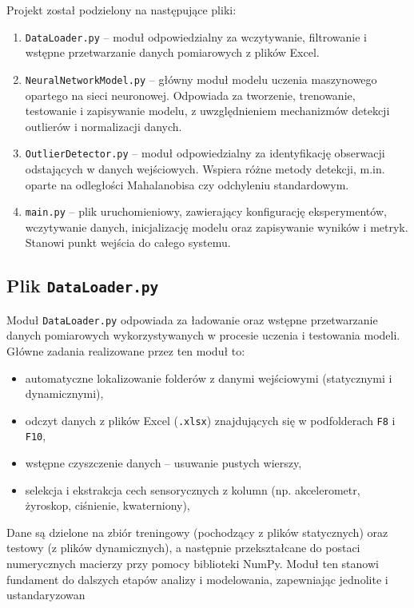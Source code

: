 \documentclass{classrep}
\begin{document}
Projekt został podzielony na następujące pliki:

\begin{enumerate}
	\item \texttt{DataLoader.py} – moduł odpowiedzialny za wczytywanie, filtrowanie i wstępne przetwarzanie danych pomiarowych z plików Excel.

	\item \texttt{NeuralNetworkModel.py} – główny moduł modelu uczenia maszynowego opartego na sieci neuronowej. Odpowiada za tworzenie, trenowanie, testowanie i zapisywanie modelu, z uwzględnieniem mechanizmów detekcji outlierów i normalizacji danych.

	\item \texttt{OutlierDetector.py} – moduł odpowiedzialny za identyfikację obserwacji odstających w danych wejściowych. Wspiera różne metody detekcji, m.in. oparte na odległości Mahalanobisa czy odchyleniu standardowym.

	\item \texttt{main.py} – plik uruchomieniowy, zawierający konfigurację eksperymentów, wczytywanie danych, inicjalizację modelu oraz zapisywanie wyników i metryk. Stanowi punkt wejścia do całego systemu.

\end{enumerate}

\clearpage{}
\subsection{Plik \texttt{DataLoader.py}}

Moduł \texttt{DataLoader.py} odpowiada za ładowanie oraz wstępne przetwarzanie danych pomiarowych wykorzystywanych w procesie uczenia i testowania modeli.
Główne zadania realizowane przez ten moduł to:
\begin{itemize}
	\item automatyczne lokalizowanie folderów z danymi wejściowymi (statycznymi i dynamicznymi),
	\item odczyt danych z plików Excel (\texttt{.xlsx}) znajdujących się w podfolderach \texttt{F8} i \texttt{F10},
	\item wstępne czyszczenie danych – usuwanie pustych wierszy,
	\item selekcja i ekstrakcja cech sensorycznych z kolumn (np. akcelerometr, żyroskop, ciśnienie, kwaterniony),
\end{itemize}
Dane są dzielone na zbiór treningowy (pochodzący z plików statycznych) oraz testowy (z plików dynamicznych), a następnie przekształcane do postaci numerycznych macierzy przy pomocy biblioteki NumPy.
Moduł ten stanowi fundament do dalszych etapów analizy i modelowania, zapewniając jednolite i ustandaryzowan
\end{document}
